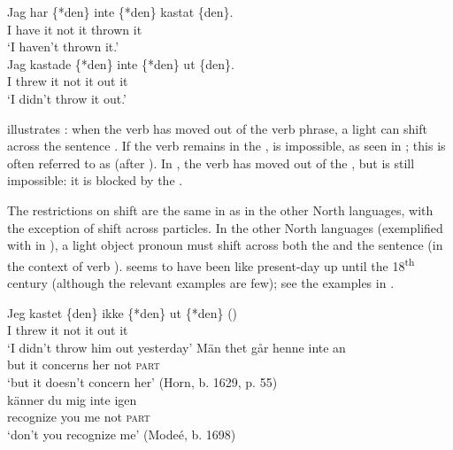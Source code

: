 \documentclass[output=paper]{langscibook}
\begin{document}
\ex\label{ex:lalu:47b}
\gll Jag    har   \{*den\}  inte   \{*den\}   kastat   \{den\}.\\
    I       have     it    not     it     thrown     it\\
\glt `I haven’t thrown it.’\\
\ex\label{ex:lalu:47c}
\gll Jag  kastade   \{*den\}   inte   \{*den\}   ut     \{den\}.\\
    I     threw       it      not     it      out     it      \\
\glt `I didn’t throw it out.'
\z
\z


 illustrates : when the verb has moved out of the verb phrase, a light  can shift across the sentence . If the verb remains in the ,  is impossible, as seen in ; this is often referred to as  (after \citealt{Holmberg1986}). In , the verb has moved out of the , but  is still impossible: it is blocked by the .



The restrictions on  shift are the same in  as in the other North  languages, with the exception of shift across particles. In the other North  languages (exemplified with  in ), a light object pronoun must shift across both the  and the sentence  (in the context of verb ).  seems to have been like present-day  up until the 18\textsuperscript{th} century (although the relevant examples are few); see the examples in .


\ea\label{ex:lalu:48}
\gll Jeg  kastet \{den\}     ikke   \{*den\}   ut   \{*den\}      ()\\
I       threw   it      not       it      out         it\\
\glt `I didn’t throw him out yesterday'
\ex\label{ex:lalu:49}
\ea
\gll  Män   thet   går           henne   inte     an\\
    but       it    concerns   her   not     \textsc{part}\\
  \glt `but it doesn’t concern her’ (Horn, b. 1629, p. 55)\\

\ex
\gll  känner     du   mig     inte     igen \\
    recognize   you   me     not     \textsc{part}\\
\glt `don’t you recognize me’ (Modeé, b. 1698)\\
\z
\z
\end{document}
